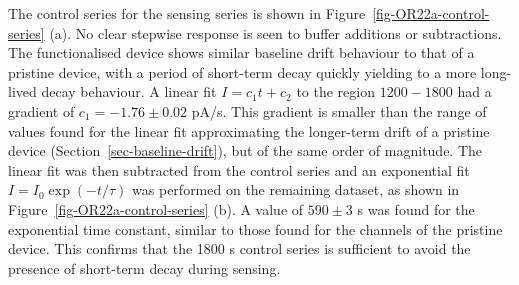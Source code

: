 \documentclass[
  a4paper,
]{scrbook}
\begin{document}
The control series for the sensing series is shown in
Figure~\ref{fig-OR22a-control-series} (a). No clear stepwise response is
seen to buffer additions or subtractions. The functionalised device
shows similar baseline drift behaviour to that of a pristine device,
with a period of short-term decay quickly yielding to a more long-lived
decay behaviour. A linear fit \(I = c_1t + c_2\) to the region
\(1200-1800\) had a gradient of \(c_1 = -1.76\pm0.02\) pA/s. This
gradient is smaller than the range of values found for the linear fit
approximating the longer-term drift of a pristine device
(Section~\ref{sec-baseline-drift}), but of the same order of magnitude.
The linear fit was then subtracted from the control series and an
exponential fit \(I = I_0\exp(-t/\tau)\) was performed on the remaining
dataset, as shown in Figure~\ref{fig-OR22a-control-series} (b). A value
of \(590 \pm 3\) s was found for the exponential time constant, similar
to those found for the channels of the pristine device. This confirms
that the 1800 s control series is sufficient to avoid the presence of
short-term decay during sensing.
\end{document}
